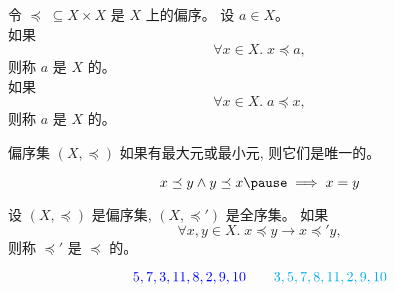 \begin{frame}{}
  \begin{definition}
    令 $\preceq \;\subseteq X \times X$ 是 $X$ 上的偏序。
    设 $a \in X$。\\[5pt]

    \pause
    如果
    \[
      \forall x \in X.\; x \preceq a,
    \]
    则称 $a$ 是 $X$ 的。\\[10pt]

    \pause
    如果
    \[
      \forall x \in X.\; a \preceq x,
    \]
    则称 $a$ 是 $X$ 的。
  \end{definition}

  \pause
  \vspace{0.30cm}
  \begin{center}
  \end{center}
\end{frame}

\begin{frame}{}
  \begin{theorem}
    偏序集 $(X, \preceq)$ 如果有最大元或最小元, 则它们是唯一的。
  \end{theorem}

  \pause
  \vspace{0.30cm}
  \begin{center}

    \pause
    \[
      x \preceq y \land y \preceq x \pause \implies x = y
    \]
    \vspace{-0.60cm}
    \begin{center}
    \end{center}
  \end{center}
\end{frame}

\begin{frame}{}
  \begin{definition}
    设 $(X, \preceq)$ 是偏序集, $(X, \preceq')$ 是全序集。
    如果
    \[
      \forall x, y \in X.\; x \preceq y \to x \preceq' y,
    \]
    则称 $\preceq'$ 是 $\preceq$ 的。
  \end{definition}


  \pause
  \vspace{-0.50cm}
  \[
    \textcolor{blue}{5, 7, 3, 11, 8, 2, 9, 10} \qquad \textcolor{cyan}{3, 5, 7, 8, 11, 2, 9, 10}
  \]
\end{frame}

